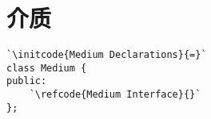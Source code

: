 \section{介质}\label{sec:介质}

\label{code:overview_Medium}
\begin{lstlisting}
`\initcode{Medium Declarations}{=}`
class Medium {
public:
    `\refcode{Medium Interface}{}`
};
\end{lstlisting}